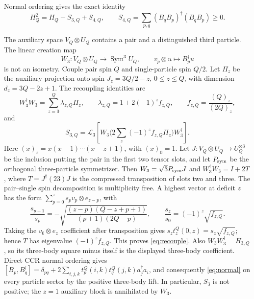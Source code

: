 \documentclass[11pt]{article}
\newcommand{\Sym}{\operatorname{Sym}}
\newcommand{\fall}[2]{(#1)_{#2}}
\begin{document}
Normal ordering gives the exact identity
\begin{equation}\label{eq:normal}
 H_Q^2=H_Q+S_{3,Q}+S_{4,Q},\qquad
 S_{4,Q}=\sum_{p,q}(B_qB_p)^\dagger(B_qB_p)\ge0.
\end{equation}

The auxiliary space $V_Q\otimes U_Q$ contains a pair and a distinguished
third particle. The linear creation map
\begin{equation}
 W_3:V_Q\otimes U_Q\longrightarrow\Sym^3U_Q,
 \qquad v_p\otimes u\longmapsto B_p^\dagger u
\end{equation}
is not an isometry. Couple pair spin $Q$ and single-particle spin $Q/2$.
Let $\Pi_z$ be the auxiliary projection onto spin $J_z=3Q/2-z$,
$0\le z\le Q$, with dimension $d_z=3Q-2z+1$.
The recoupling identities are
\begin{equation}\label{eq:recouple}
 W_3^\dagger W_3=\sum_{z=0}^Q\lambda_{z,Q}\Pi_z,
 \qquad \lambda_{z,Q}=1+2(-1)^z f_{z,Q},\qquad
 f_{z,Q}=\frac{\fall Qz}{\fall{2Q}z},
\end{equation}
and
\begin{equation}
 S_{3,Q}=\mathcal L_3\!\left[
 W_3\Big(2\sum_z(-1)^z f_{z,Q}\Pi_z\Big)W_3^\dagger\right].
\end{equation}
Here $\fall xz=x(x-1)\cdots(x-z+1)$, with $\fall x0=1$.
Let $J:V_Q\otimes U_Q\to U_Q^{\otimes3}$ be the inclusion
putting the pair in the first two tensor slots, and let $P_{\rm sym}$ be the
orthogonal three-particle symmetrizer. Then
$W_3=\sqrt3P_{\rm sym}J$ and
$W_3^\dagger W_3=I+2T$, where $T=J^\dagger(23)J$ is the compressed
transposition of slots two and three. The pair--single spin decomposition is
multiplicity free. A highest vector at deficit $z$ has the form
$\sum_{p=0}^zs_pv_p\otimes e_{z-p}$, with
\begin{equation}
 \frac{s_{p+1}}{s_p}
 =-\sqrt{\frac{(z-p)(Q-z+p+1)}{(p+1)(2Q-p)}},\qquad
 \frac{s_z}{s_0}=(-1)^z\sqrt{f_{z,Q}}.
\end{equation}
Taking the $v_0\otimes e_z$ coefficient after transposition gives
$s_zt_z^Q(0,z)=s_z\sqrt{f_{z,Q}}$; hence $T$ has eigenvalue
$(-1)^zf_{z,Q}$. This proves \eqref{eq:recouple}. Also
$W_3W_3^\dagger=H_{3,Q}$, so its three-body square minus itself is the
displayed three-body coefficient. Direct CCR normal ordering gives
$[B_p,B_q^\dagger]=\delta_{pq}+
2\sum_{i,j,k}t_p^Q(i,k)t_q^Q(j,k)a_j^\dagger a_i$,
and consequently \eqref{eq:normal} on every particle sector by the positive
three-body lift. In particular, $S_3$ is not positive; the $z=1$ auxiliary
block is annihilated by $W_3$.
\end{document}
